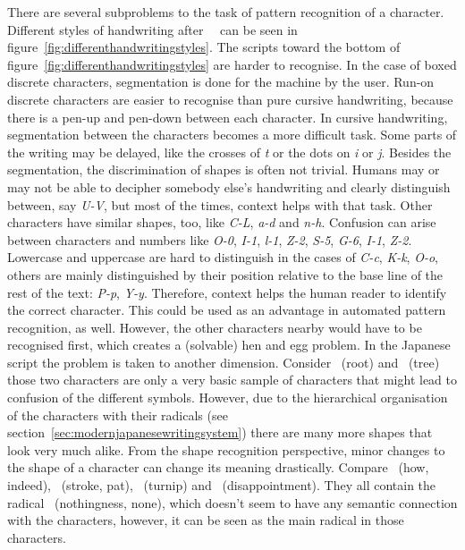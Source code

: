
There are several subproblems to the task of pattern recognition of a character.
Different styles of handwriting after~~\citeyear{Tappert1990} can be seen in 
figure~\ref{fig:differenthandwritingstyles}.
The scripts toward the bottom of figure~\ref{fig:differenthandwritingstyles} 
are harder to recognise. In the case of boxed discrete characters, segmentation 
is done for the machine by the user. Run-on discrete characters are easier to 
recognise than pure cursive handwriting, because there is a pen-up and 
pen-down between each character. In cursive handwriting, segmentation 
between the characters becomes a more difficult task. Some parts of the writing
may be delayed, like the crosses of \emph{t} or the dots on \emph{i} or \emph{j}.
Besides the segmentation, the discrimination of shapes is often not trivial.
Humans may or may not be able to decipher somebody else's handwriting and clearly
distinguish between, say \emph{U-V}, but most of the times, context helps with 
that task. Other characters have similar shapes, too, like \emph{C-L}, \emph{a-d}
and \emph{n-h}. Confusion can arise between characters and numbers like 
\emph{O-0}, \emph{I-1}, \emph{l-1}, \emph{Z-2}, \emph{S-5}, \emph{G-6}, 
\emph{I-1}, \emph{Z-2}. Lowercase and uppercase are hard to distinguish in the
cases of \emph{C-c}, \emph{K-k}, \emph{O-o}, others are mainly distinguished 
by their position relative to the base line of the rest of the text: 
\emph{P-p}, \emph{Y-y}. Therefore, context helps the human reader to identify
the correct character. This could be used as an advantage in automated pattern
recognition, as well. However, the other characters nearby would have to be
recognised first, which creates a (solvable) hen and egg problem.
In the Japanese script the problem is taken to another dimension. 
Consider ~(root) and ~(tree) those two characters are only a 
very basic sample of characters that might lead to confusion of the different 
symbols. However, due to the hierarchical organisation of the characters 
with their radicals (see section~\ref{sec:modernjapanesewritingsystem}) there 
are many more shapes that look very much alike. From the shape recognition 
perspective, minor changes to the shape of a character can change its meaning 
drastically.
Compare ~(how, indeed), ~(stroke, pat), ~(turnip) and
~(disappointment). They all contain the radical 
~(nothingness, none), which doesn't seem to have any semantic connection
with the characters, however, it can be seen as the main radical in those 
characters.

